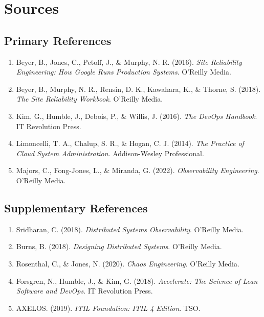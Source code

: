 \documentclass[11pt,letterpaper]{article}
\begin{document}
\section{Sources}

\subsection{Primary References}

\begin{enumerate}
    \item Beyer, B., Jones, C., Petoff, J., \& Murphy, N. R. (2016). \textit{Site Reliability Engineering: How Google Runs Production Systems}. O'Reilly Media.
    
    \item Beyer, B., Murphy, N. R., Rensin, D. K., Kawahara, K., \& Thorne, S. (2018). \textit{The Site Reliability Workbook}. O'Reilly Media.
    
    \item Kim, G., Humble, J., Debois, P., \& Willis, J. (2016). \textit{The DevOps Handbook}. IT Revolution Press.
    
    \item Limoncelli, T. A., Chalup, S. R., \& Hogan, C. J. (2014). \textit{The Practice of Cloud System Administration}. Addison-Wesley Professional.
    
    \item Majors, C., Fong-Jones, L., \& Miranda, G. (2022). \textit{Observability Engineering}. O'Reilly Media.
\end{enumerate}

\subsection{Supplementary References}

\begin{enumerate}[resume]
    \item Sridharan, C. (2018). \textit{Distributed Systems Observability}. O'Reilly Media.
    
    \item Burns, B. (2018). \textit{Designing Distributed Systems}. O'Reilly Media.
    
    \item Rosenthal, C., \& Jones, N. (2020). \textit{Chaos Engineering}. O'Reilly Media.
    
    \item Forsgren, N., Humble, J., \& Kim, G. (2018). \textit{Accelerate: The Science of Lean Software and DevOps}. IT Revolution Press.
    
    \item AXELOS. (2019). \textit{ITIL Foundation: ITIL 4 Edition}. TSO.
\end{enumerate}
\end{document}

